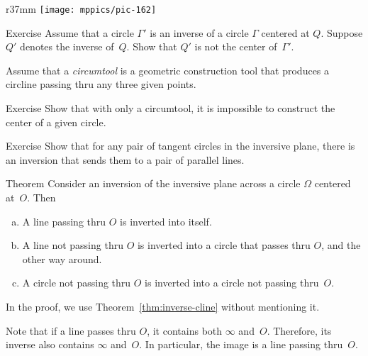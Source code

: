 {

\begin{wrapfigure}{r}{37mm}
\vskip-7mm
\centering
\texttt{[image: mppics/pic-162]}
\end{wrapfigure}

\begin{thm}{Exercise}\label{ex:inv-center not=center-inv}
Assume that a circle $\Gamma'$ is an inverse of a circle $\Gamma$ centered at $Q$.
Suppose $Q'$ denotes the inverse of~$Q$.
Show that $Q'$ is not the center of~$\Gamma'$.
\end{thm}

Assume that a \emph{circumtool} is a geometric construction tool 
that produces a circline passing thru any three given points.

}

\begin{thm}{Exercise}\label{ex:circumtool}
Show that with only a circumtool,
it is impossible to construct the center of a given circle.
\end{thm}


\begin{thm}{Exercise}\label{ex:tangent-circ->parallels}
Show that for any pair of tangent circles in the inversive plane, there is an inversion that sends them to a pair of parallel lines.
\end{thm}

\begin{thm}{Theorem}\label{thm:inverse}
Consider an inversion of the inversive plane across a circle $\Omega$ centered at~$O$. 
Then 
\begin{enumerate}[(a)]
\item\label{thm:inverse:line-line}
A line passing thru $O$ is inverted into itself.
\item\label{thm:inverse:line} 
A line not passing thru $O$ is inverted into a circle that passes thru $O$, and the other way around.
\item\label{thm:inverse:circle} 
A circle not passing thru $O$ 
is inverted into a circle not passing thru~$O$. 
\end{enumerate}
\end{thm}

In the proof, we use Theorem~\ref{thm:inverse-cline} without mentioning it.

Note that if a line passes thru $O$, it contains both $\infty$ and~$O$.
Therefore, its inverse also contains $\infty$ and~$O$.
In particular, the image is a line passing thru~$O$.

